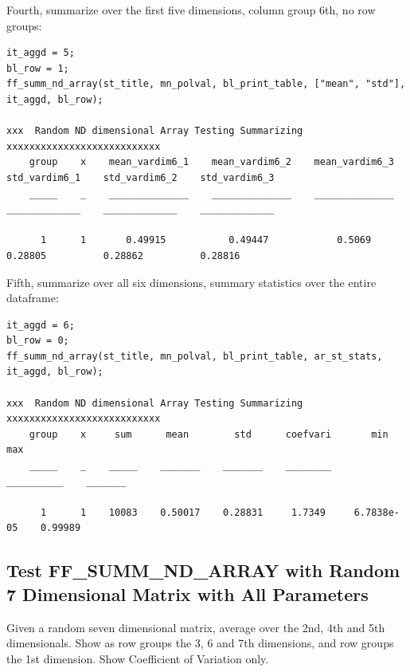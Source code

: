 \documentclass[
]{book}
\begin{document}
Fourth, summarize over the first five dimensions, column group 6th, no
row groups:

\begin{verbatim}
it_aggd = 5;
bl_row = 1; 
ff_summ_nd_array(st_title, mn_polval, bl_print_table, ["mean", "std"], it_aggd, bl_row);

xxx  Random ND dimensional Array Testing Summarizing  xxxxxxxxxxxxxxxxxxxxxxxxxxx
    group    x    mean_vardim6_1    mean_vardim6_2    mean_vardim6_3    std_vardim6_1    std_vardim6_2    std_vardim6_3
    _____    _    ______________    ______________    ______________    _____________    _____________    _____________

      1      1       0.49915           0.49447            0.5069           0.28805          0.28862          0.28816   
\end{verbatim}

Fifth, summarize over all six dimensions, summary statistics over the
entire dataframe:

\begin{verbatim}
it_aggd = 6;
bl_row = 0; 
ff_summ_nd_array(st_title, mn_polval, bl_print_table, ar_st_stats, it_aggd, bl_row);

xxx  Random ND dimensional Array Testing Summarizing  xxxxxxxxxxxxxxxxxxxxxxxxxxx
    group    x     sum      mean        std      coefvari       min          max  
    _____    _    _____    _______    _______    ________    __________    _______

      1      1    10083    0.50017    0.28831     1.7349     6.7838e-05    0.99989
\end{verbatim}

\hypertarget{test-ff_summ_nd_array-with-random-7-dimensional-matrix-with-all-parameters}{%
\subsection{Test FF\_SUMM\_ND\_ARRAY with Random 7 Dimensional Matrix with All Parameters}\label{test-ff_summ_nd_array-with-random-7-dimensional-matrix-with-all-parameters}}

Given a random seven dimensional matrix, average over the 2nd, 4th and
5th dimensionals. Show as row groups the 3, 6 and 7th dimensions, and
row groups the 1st dimension. Show Coefficient of Variation only.
\end{document}
